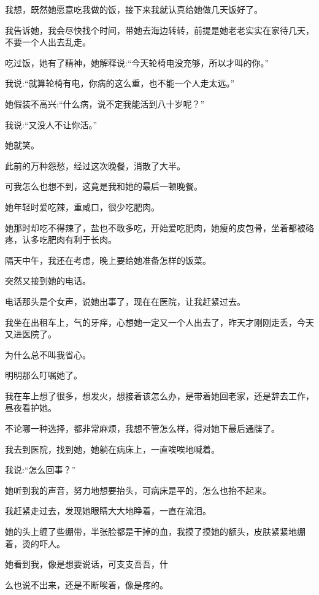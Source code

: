 \documentclass{article}
\begin{document}
我想，既然她愿意吃我做的饭，接下来我就认真给她做几天饭好了。

\newpage 



我告诉她，我会尽快找个时间，带她去海边转转，前提是她老老实实在家待几天，不要一个人出去乱走。

吃过饭，她有了精神，她解释说:“今天轮椅电没充够，所以才叫的你。”

我说:“就算轮椅有电，你病的这么重，也不能一个人走太远。”

她假装不高兴:“什么病，说不定我能活到八十岁呢？”

我说:“又没人不让你活。”

她就笑。

此前的万种怨愁，经过这次晚餐，消散了大半。

可我怎么也想不到，这竟是我和她的最后一顿晚餐。

她年轻时爱吃辣，重咸口，很少吃肥肉。

她那时却吃不得辣了，盐也不敢多吃，开始爱吃肥肉，她瘦的皮包骨，坐着都被硌疼，认多吃肥肉有利于长肉。

隔天中午，我还在考虑，晚上要给她准备怎样的饭菜。

\newpage 



突然又接到她的电话。

电话那头是个女声，说她出事了，现在在医院，让我赶紧过去。

我坐在出租车上，气的牙痒，心想她一定又一个人出去了，昨天才刚刚走丢，今天又进医院了。

为什么总不叫我省心。

明明那么叮嘱她了。

我在车上想了很多，想发火，想接着该怎么办，是带着她回老家，还是辞去工作，昼夜看护她。

不论哪一种选择，都非常麻烦，我想不管怎么样，得对她下最后通牒了。

我去到医院，找到她，她躺在病床上，一直唉唉地喊着。

我说:“怎么回事？”

她听到我的声音，努力地想要抬头，可病床是平的，怎么也抬不起来。

我赶紧走过去，发现她眼睛大大地睁着，一直在流泪。

她的头上缠了些绷带，半张脸都是干掉的血，我摸了摸她的额头，皮肤紧紧地绷着，烫的吓人。

她看到我，像是想要说话，可支支吾吾，什

\newpage 

么也说不出来，还是不断唉着，像是疼的。
\end{document}

